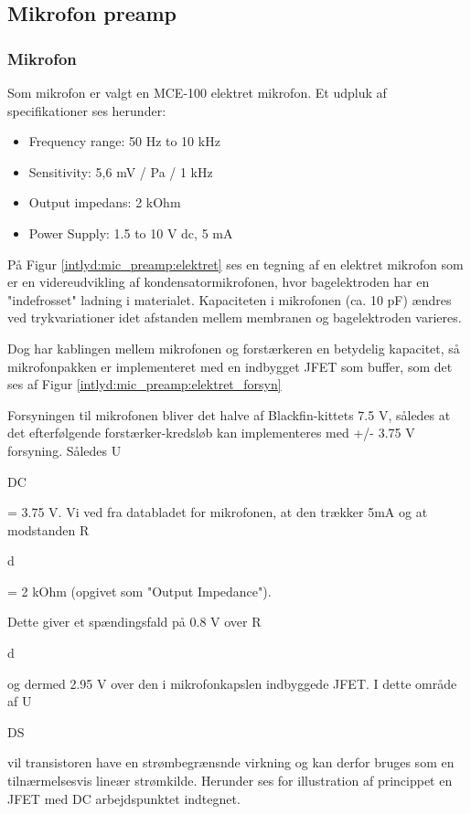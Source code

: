
\subsection{Mikrofon preamp}

\subsubsection{Mikrofon} 
Som mikrofon er valgt en MCE-100 elektret mikrofon. Et udpluk af specifikationer ses herunder:
\begin{itemize}
	\item Frequency range: 50 Hz to 10 kHz
	\item Sensitivity: 5,6 mV / Pa / 1 kHz
	\item Output impedans: 2 kOhm
	\item Power Supply: 1.5 to 10 V dc, 5 mA
\end{itemize}
 
På Figur \ref{intlyd:mic_preamp:elektret} ses en tegning af en elektret mikrofon som er en videreudvikling af kondensatormikrofonen, hvor bagelektroden har en "indefrosset" ladning i materialet. Kapaciteten i mikrofonen (ca. 10 pF) ændres ved trykvariationer idet afstanden mellem membranen og bagelektroden varieres. 


Dog har kablingen mellem mikrofonen og forstærkeren en betydelig kapacitet, så mikrofonpakken er implementeret med en indbygget JFET som buffer, som det ses af Figur \ref{intlyd:mic_preamp:elektret_forsyn}

Forsyningen til mikrofonen bliver det halve af Blackfin-kittets 7.5 V, således at det efterfølgende forstærker-kredsløb kan implementeres med +/- 3.75 V forsyning. Således U\begin{tiny}DC\end{tiny} = 3.75 V. 
Vi ved fra databladet for mikrofonen, at den trækker 5mA og at modstanden R\begin{tiny}d\end{tiny} = 2 kOhm (opgivet som "Output Impedance").

Dette giver et spændingsfald på 0.8 V over R\begin{tiny}d\end{tiny} og dermed 2.95 V over den i mikrofonkapslen indbyggede JFET. I dette område af U\begin{tiny}DS\end{tiny} vil transistoren have en strømbegrænsnde virkning og kan derfor bruges som en tilnærmelsesvis lineær strømkilde. Herunder ses for illustration af princippet en JFET med DC arbejdspunktet indtegnet.

